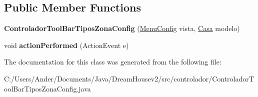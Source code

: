 \subsection*{Public Member Functions}
\begin{DoxyCompactItemize}
\item 
\mbox{\label{classcontrolador_1_1_controlador_tool_bar_tipos_zona_config_abe5f20494136e5255907b56cc2b84fe1}} 
{\bfseries Controlador\+Tool\+Bar\+Tipos\+Zona\+Config} (\mbox{\hyperlink{classvista_1_1_menu_config}{Menu\+Config}} vista, \mbox{\hyperlink{classmodelo_1_1_casa}{Casa}} modelo)
\item 
\mbox{\label{classcontrolador_1_1_controlador_tool_bar_tipos_zona_config_a4a1a33dc6048a80803fea31e42b77068}} 
void {\bfseries action\+Performed} (Action\+Event e)
\end{DoxyCompactItemize}


The documentation for this class was generated from the following file\+:\begin{DoxyCompactItemize}
\item 
C\+:/\+Users/\+Ander/\+Documents/\+Java/\+Dream\+Housev2/src/controlador/Controlador\+Tool\+Bar\+Tipos\+Zona\+Config.\+java\end{DoxyCompactItemize}
